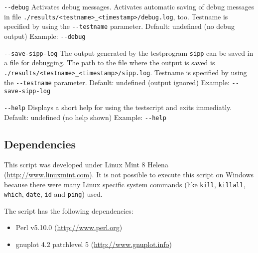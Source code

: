 \begin{description}
\item {\texttt{-{}-debug}} \newline
Activates debug messages. Activates automatic saving of debug messages
in file \texttt{./results/<testname>\_<timestamp>/debug.log}, too.
Testname is specified by using the \texttt{-{}-testname} parameter.
\newline Default: undefined (no debug output)
\newline Example: \texttt{-{}-debug}

\item {\texttt{-{}-save-sipp-log}} \newline
The output generated by the testprogram \texttt{sipp} can be saved in a file for debugging.
The path to the file where the output is saved is \newline
\texttt{./results/<testname>\_<timestamp>/sipp.log}.
Testname is specified by using the \texttt{-{}-testname} parameter.
\newline Default: undefined (output ignored)
\newline Example: \texttt{-{}-save-sipp-log}

\item {\texttt{-{}-help}} \newline
Displays a short help for using the testscript and exits immediatly.
\newline Default: undefined (no help shown)
\newline Example: \texttt{-{}-help}

\end{description}
\subsection{Dependencies}%
This script was developed under Linux Mint 8 Helena (\url{http://www.linuxmint.com}).
It is not possible to execute this script on Windows because there were many Linux specific system commands
(like \texttt{kill}, \texttt{killall}, \texttt{which}, \texttt{date}, \texttt{id} and \texttt{ping}) used.

The script has the following dependencies:
\begin{itemize}
	\item Perl v5.10.0 (\url{http://www.perl.org})
	\item gnuplot 4.2 patchlevel 5 (\url{http://www.gnuplot.info})
\end{itemize}
